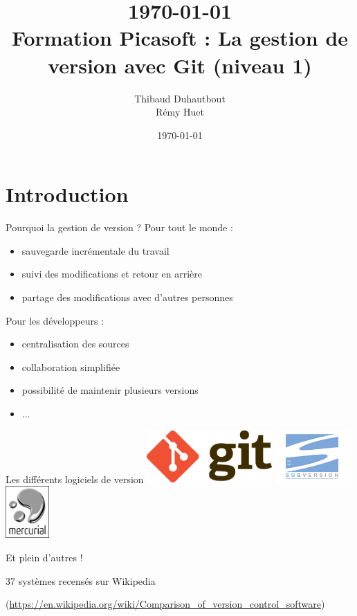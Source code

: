 \documentclass[usepdftitle=false]{beamer}
\title[Formation Git\_v1]{\today \\ Formation Picasoft : La gestion de version avec Git (niveau 1)}
\author[T. Duhautbout - R. Huet]{Thibaud {\sc Duhautbout} \\ Rémy {\sc Huet}}
\institute[Picasoft]{Association Picasoft}
\date\today
\begin{document}
\begin{frame}
	\titlepage
\end{frame}

\section{Introduction}

\begin{frame}{Pourquoi la gestion de version ?}
Pour tout le monde :
\begin{itemize}
\item sauvegarde incrémentale du travail
\item suivi des modifications et retour en arrière
\item partage des modifications avec d'autres personnes
\end{itemize}

\medskip

Pour les développeurs :
\begin{itemize}
\item centralisation des sources
\item collaboration simplifiée
\item possibilité de maintenir plusieurs versions
\item ...
\end{itemize}
\end{frame}

\begin{frame}{Les différents logiciels de version}
\includegraphics[height=2cm]{./imgs/logo_git.png}
\hfill
\includegraphics[height=2cm]{./imgs/logo_svn.png}
\hfill
\includegraphics[height=2cm]{./imgs/logo_mercurial.png}

\bigskip

\centering
Et plein d'autres !

37 systèmes recensés sur Wikipedia

(\url{https://en.wikipedia.org/wiki/Comparison_of_version_control_software})
\end{frame}
\end{document}
